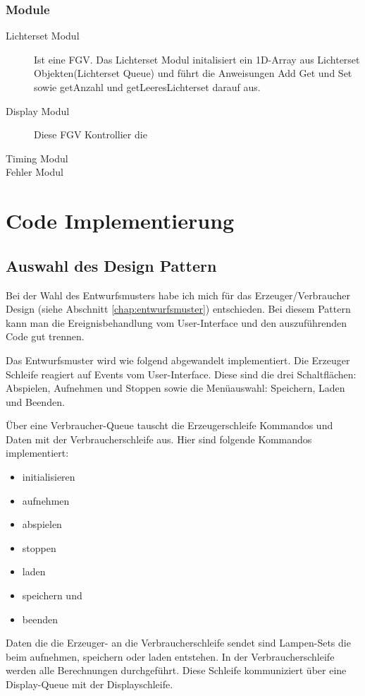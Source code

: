 \subsubsection{Module}

\begin{description}
\item[Lichterset Modul]
Ist eine FGV. Das Lichterset Modul initalisiert ein 1D-Array aus Lichterset Objekten(Lichterset Queue) und führt die Anweisungen Add Get und Set sowie getAnzahl und getLeeresLichterset darauf aus.


\item[Display Modul]
Diese FGV Kontrollier die 

\item[Timing Modul]
\item[Fehler Modul]

\end{description}



	

\section{Code Implementierung}
		\subsection{Auswahl des Design Pattern} %
		\label{chap:designpattern}
		Bei der Wahl des Entwurfsmusters habe ich mich für das Erzeuger/Verbraucher Design  (siehe Abschnitt \ref{chap:entwurfsmuster}) entschieden. Bei diesem Pattern kann man die Ereignisbehandlung vom User-Interface und den auszuführenden Code gut trennen. 

Das Entwurfsmuster wird wie folgend abgewandelt implementiert.  Die Erzeuger Schleife reagiert auf Events vom User-Interface. Diese sind die drei Schaltflächen: Abspielen, Aufnehmen und Stoppen sowie die Menüauswahl: Speichern, Laden und Beenden.

Über eine Verbraucher-Queue tauscht die Erzeugerschleife Kommandos und Daten mit der Verbraucherschleife aus. Hier sind folgende Kommandos implementiert:
\begin{itemize}
\item initialisieren
\item aufnehmen
\item abspielen
\item stoppen
\item laden
\item speichern und
\item beenden
\end{itemize}
Daten die die Erzeuger- an die Verbraucherschleife sendet sind Lampen-Sets die beim aufnehmen, speichern oder laden entstehen. In der Verbraucherschleife werden alle Berechnungen durchgeführt. Diese Schleife kommuniziert über eine Display-Queue mit der Displayschleife.

